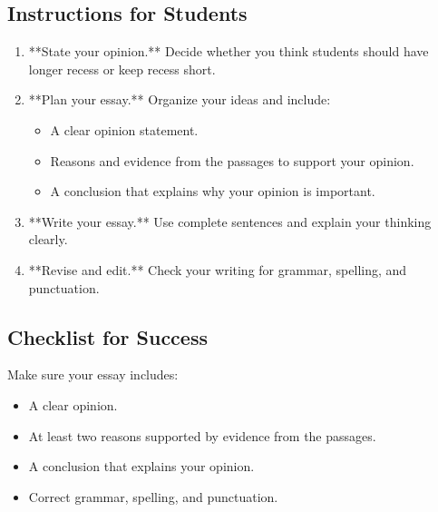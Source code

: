 \documentclass[12pt]{article}
\begin{document}
\subsection*{Instructions for Students}

\begin{enumerate}
    \item **State your opinion.** Decide whether you think students should have longer recess or keep recess short.
    \item **Plan your essay.** Organize your ideas and include:
    \begin{itemize}
        \item A clear opinion statement.
        \item Reasons and evidence from the passages to support your opinion.
        \item A conclusion that explains why your opinion is important.
    \end{itemize}
    \item **Write your essay.** Use complete sentences and explain your thinking clearly.
    \item **Revise and edit.** Check your writing for grammar, spelling, and punctuation.
\end{enumerate}

\subsection*{Checklist for Success}

Make sure your essay includes:
\begin{itemize}
    \item A clear opinion.
    \item At least two reasons supported by evidence from the passages.
    \item A conclusion that explains your opinion.
    \item Correct grammar, spelling, and punctuation.
\end{itemize}
\end{document}
